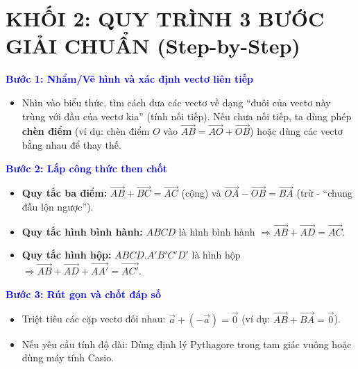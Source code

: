 \documentclass[12pt,a4paper]{article}
\begin{document}
\section*{KHỐI 2: QUY TRÌNH 3 BƯỚC GIẢI CHUẨN (Step-by-Step)}
\begin{tcolorbox}[colback=green!5!white,colframe=green!55!black,title=\textbf{Quy trình hành động}]
\textbf{\textcolor{blue}{Bước 1: Nhẩm/Vẽ hình và xác định vectơ liên tiếp}}
\begin{itemize}
    \item Nhìn vào biểu thức, tìm cách đưa các vectơ về dạng ``đuôi của vectơ này trùng với đầu của vectơ kia'' (tính nối tiếp). Nếu chưa nối tiếp, ta dùng phép \textbf{chèn điểm} (ví dụ: chèn điểm $O$ vào $\vec{AB} = \vec{AO} + \vec{OB}$) hoặc dùng các vectơ bằng nhau để thay thế.
\end{itemize}

\textbf{\textcolor{blue}{Bước 2: Lắp công thức then chốt}}
\begin{itemize}
    \item \textbf{Quy tắc ba điểm:} $\vec{AB} + \vec{BC} = \vec{AC}$ (cộng) và $\vec{OA} - \vec{OB} = \vec{BA}$ (trừ - ``chung đầu lộn ngược'').
    \item \textbf{Quy tắc hình bình hành:} $ABCD$ là hình bình hành $\Rightarrow \vec{AB} + \vec{AD} = \vec{AC}$.
    \item \textbf{Quy tắc hình hộp:} $ABCD.A'B'C'D'$ là hình hộp $\Rightarrow \vec{AB} + \vec{AD} + \vec{AA'} = \vec{AC'}$.
\end{itemize}

\textbf{\textcolor{blue}{Bước 3: Rút gọn và chốt đáp số}}
\begin{itemize}
    \item Triệt tiêu các cặp vectơ đối nhau: $\vec{a} + (-\vec{a}) = \vec{0}$ (ví dụ: $\vec{AB} + \vec{BA} = \vec{0}$).
    \item Nếu yêu cầu tính độ dài: Dùng định lý Pythagore trong tam giác vuông hoặc dùng máy tính Casio.
\end{itemize}
\end{tcolorbox}

\end{document}
